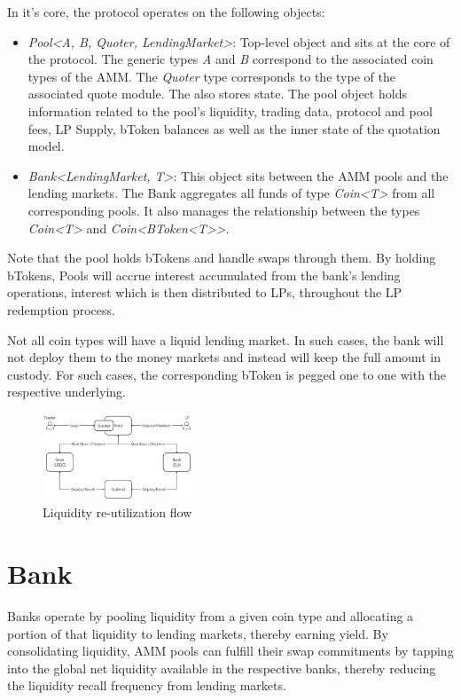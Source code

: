 \documentclass[sigconf,nonacm,prologue,table]{acmart}
\numberwithin{equation}{section}
\theoremstyle{definition}
\theoremstyle{remark}
\begin{document}
In it's core, the protocol operates on the following objects:
\begin{itemize}
    \item \emph{Pool<A, B, Quoter, LendingMarket>}: Top-level object and sits at the core of the protocol. The generic types \emph{A} and \emph{B} correspond to the associated coin types of the AMM. The \emph{Quoter} type corresponds to the type of the associated quote module. The  also stores state. The pool object holds information related to the pool's liquidity, trading data, protocol and pool fees, LP Supply, bToken balances as well as the inner state of the quotation model.
    
    \item \emph{Bank<LendingMarket, T>}: This object sits between the AMM pools and the lending markets. The Bank aggregates all funds of type \emph{Coin<T>} from all corresponding pools. It also manages the relationship between the types \emph{Coin<T>} and \emph{Coin<BToken<T>>}.
\end{itemize}

Note that the pool holds bTokens and handle swaps through them. By holding bTokens, Pools will accrue interest accumulated from the bank's lending operations, interest which is then distributed to LPs, throughout the LP redemption process.

Not all coin types will have a liquid lending market. In such cases, the bank will not deploy them to the money markets and instead will keep the full amount in custody. For such cases, the corresponding bToken is pegged one to one with the respective underlying.

\begin{figure}[htbp]
  \centering
  \includegraphics[width=0.4\textwidth]{assets/flow.png}
  \caption{Liquidity re-utilization flow}
  \label{fig:workflow}
\end{figure}

\section{Bank}
\label{sec:liquidityreutilization}

Banks operate by pooling liquidity from a given coin type and allocating a portion of that liquidity to lending markets, thereby earning yield. By consolidating liquidity, AMM pools can fulfill their swap commitments by tapping into the global net liquidity available in the respective banks, thereby reducing the liquidity recall frequency from lending markets.
\end{document}
